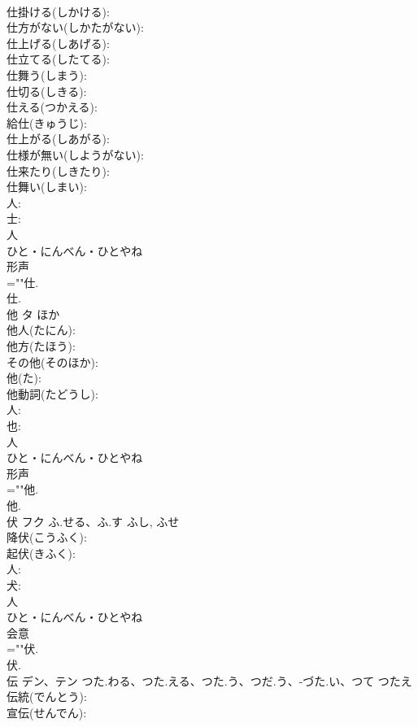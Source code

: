 \documentclass[8pt]{extreport}
\begin{document}
\begin{CJK}{UTF8}{min}
\\	仕掛ける(しかける): 
\\	仕方がない(しかたがない): 
\\	仕上げる(しあげる): 
\\	仕立てる(したてる): 
\\	仕舞う(しまう): 
\\	仕切る(しきる): 
\\	仕える(つかえる): 
\\	給仕(きゅうじ): 
\\	仕上がる(しあがる): 
\\	仕様が無い(しようがない): 
\\	仕来たり(しきたり): 
\\	仕舞い(しまい): 
\\	人: 
\\	士: 
\\	人	
\\	ひと・にんべん・ひとやね	
\\	形声 
\\	=""仕.
\\	仕.
\\	他	タ	ほか		
\\	他人(たにん): 
\\	他方(たほう): 
\\	その他(そのほか): 
\\	他(た): 
\\	他動詞(たどうし): 
\\	人: 
\\	也: 
\\	人	
\\	ひと・にんべん・ひとやね	
\\	形声 
\\	=""他.
\\	他.
\\	伏	フク	ふ.せる、ふ.す	ふし, ふせ	
\\	降伏(こうふく): 
\\	起伏(きふく): 
\\	人: 
\\	犬: 
\\	人	
\\	ひと・にんべん・ひとやね	
\\	会意 
\\	=""伏.
\\	伏.
\\	伝	デン、テン	つた.わる、つた.える、つた.う、つだ.う、-づた.い、つて	つたえ	
\\	伝統(でんとう): 
\\	宣伝(せんでん): 

\end{CJK}
\end{document}
